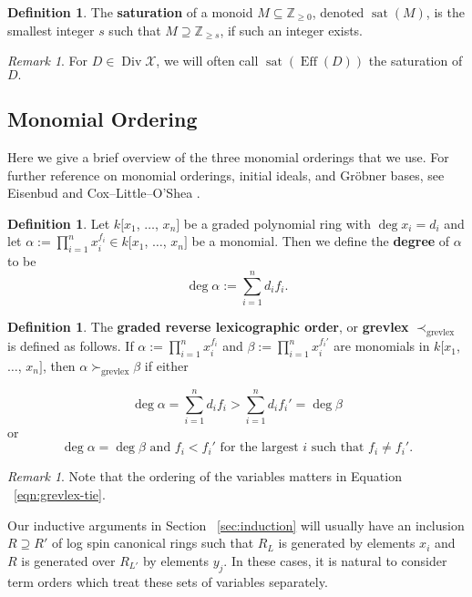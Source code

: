 \documentclass{amsart}
\theoremstyle{plain}
\theoremstyle{definition}
\newtheorem{defn}[thm]{Definition}
\theoremstyle{remark}
\newtheorem{rem}[thm]{Remark}
\numberwithin{equation}{section}
\newcommand\ssec{\subsection}
\newcommand\BZ{{\mathbb Z}}
\DeclareMathOperator\di{Div}
\newcommand\sx{\mathscr X}
\newcommand{\halfcan}{L}
\DeclareMathOperator{\Eff}{Eff}
\DeclareMathOperator{\sat}{sat}
\begin{document}
\begin{defn}
\label{defn:sat}
The \textbf{saturation} of a monoid $M \subseteq \BZ_{\geq 0}$,
denoted $\sat(M)$, is the smallest integer $s$ such that $M
\supseteq \BZ_{\geq s}$, if such an integer exists.
\end{defn}

\begin{rem}
For $D \in \di \sx$, we will often call $\sat(\Eff(D))$ the saturation of $D.$
\end{rem}

\ssec{Monomial Ordering}
\label{ssec:monomial-order}
Here we give a brief overview of the three monomial orderings
that we use. For further reference on monomial orderings,
initial ideals, and Gr\"{o}bner bases, see Eisenbud
\cite[Section 15.9]{eisenbud:comm-alg} and Cox--Little--O'Shea
\cite[Chapter 2]{cls:ideals-varieties-algorithms}.

\begin{defn}
\label{defn:monomial-degree}
Let $k[x_1$, $\ldots$, $x_n]$ be a graded polynomial
ring with $\deg x_i = d_i$ and let $\alpha := \prod_{i = 1}^{n} x_{i}^{f_i} \in
k[x_{1}$, $\ldots$, $x_{n}]$ be a monomial. Then
we define the {\bf degree} of $\alpha$ to be
\[
	\deg \alpha := \sum_{i = 1}^{n} d_i f_i.
\]
\end{defn}

\begin{defn}
\label{defn:grevlex}
The {\bf graded reverse lexicographic order}, or {\bf grevlex} $\prec_{\text{grevlex}}$ is defined as follows.
If $\alpha := \prod_{i = 1}^{n} x_{i}
^{f_i}$ and $\beta := \prod_{i = 1}^{n} x_{i}^{f_i'}$ are
monomials in $k[x_{1}$, $\ldots$, $x_{n}]$, then $\alpha
\succ_{\text{grevlex}} \beta$ if either

\begin{equation}
	\deg \alpha = \sum_{i = 1}^{n} d_i f_i  > \sum_{i = 1}^{n} d_i f_i' = \deg \beta
\end{equation}
or
\begin{equation}
\label{eqn:grevlex-tie}
	\deg \alpha = \deg \beta \text{ and }	f_i < f_i' \text{ for
	the	largest } i \text{ such that } f_i \neq f_i'.
\end{equation}
\end{defn}

\begin{rem}
Note that the ordering of the variables matters in Equation
~\ref{eqn:grevlex-tie}.
\end{rem}

Our inductive arguments in Section ~\ref{sec:induction} will
usually have an inclusion $R \supseteq R'$ of log spin canonical
rings such that $R_\halfcan$ is generated by elements $x_{i}$ and $R$
is generated over $R_{\halfcan'}$ by elements $y_j$. In these cases, it is
natural to consider term orders which treat these sets of variables
separately.
\end{document}
